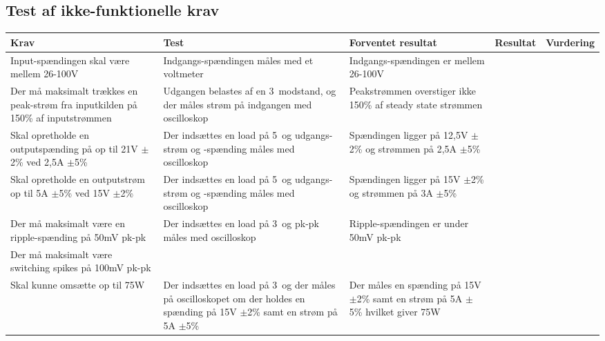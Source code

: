 \subsection{Test af ikke-funktionelle krav}

\begin{tabularx}{\textwidth}{|X|X|X|X|X|}
	\hline
	\textbf{Krav} & \textbf{Test} & \textbf{Forventet resultat} & \textbf{Resultat} & \textbf{Vurdering} \\ \hline
	Input-spændingen skal være mellem 26-100V & Indgangs-spændingen måles med et voltmeter & Indgangs-spændingen er mellem 26-100V && \\ \hline
	Der må maksimalt trækkes en peak-strøm fra inputkilden på 150\% af inputstrømmen & Udgangen belastes af en 3\ohm\ modstand, og der måles strøm på indgangen med oscilloskop & Peakstrømmen overstiger ikke 150\% af steady state strømmen & & \\ \hline
	Skal opretholde en outputspænding på op til 21V $\pm$2\% ved 2,5A $\pm$5\% & Der indsættes en load på 5\ohm\ og udgangs-strøm og -spænding måles med oscilloskop & Spændingen ligger på 12,5V $\pm$2\% og strømmen på 2,5A $\pm$5\% && \\ \hline
	Skal opretholde en outputstrøm op til 5A $\pm$5\% ved 15V $\pm$2\% & Der indsættes en load på 5\ohm\ og udgangs-strøm og -spænding måles med oscilloskop & Spændingen ligger på 15V $\pm$2\% og strømmen på 3A $\pm$5\% && \\ \hline
	Der må maksimalt være en ripple-spænding på 50mV pk-pk & Der indsættes en load på 3\ohm\ og pk-pk måles med oscilloskop & Ripple-spændingen er under 50mV pk-pk && \\ \hline
	Der må maksimalt være switching spikes på 100mV pk-pk &  &  && \\ \hline
	Skal kunne omsætte op til 75W & Der indsættes en load på 3\ohm\ og der måles på oscilloskopet om der holdes en spænding på 15V $\pm$2\% samt en strøm på 5A $\pm$5\% & Der måles en spænding på 15V $\pm$2\% samt en strøm på 5A $\pm$5\% hvilket giver 75W && \\ \hline
\end{tabularx}



